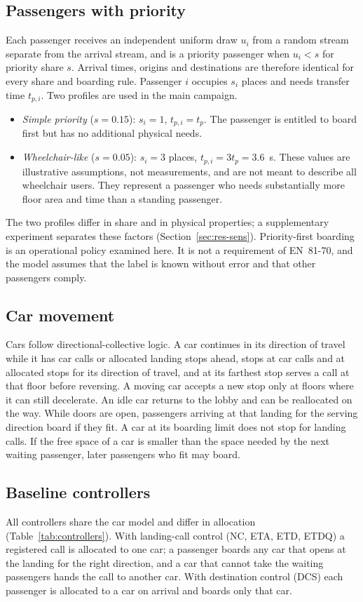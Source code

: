 \documentclass[12pt,a4paper]{article}
\begin{document}
\subsection{Passengers with priority}\label{sec:profiles}
Each passenger receives an independent uniform draw $u_i$ from a random stream separate from the arrival stream, and is a priority passenger when $u_i<s$ for priority share $s$. Arrival times, origins and destinations are therefore identical for every share and boarding rule. Passenger $i$ occupies $s_i$ places and needs transfer time $t_{p,i}$. Two profiles are used in the main campaign.
\begin{itemize}[itemsep=1pt]
\item \emph{Simple priority} ($s=0.15$): $s_i=1$, $t_{p,i}=t_p$. The passenger is entitled to board first but has no additional physical needs.
\item \emph{Wheelchair-like} ($s=0.05$): $s_i=3$ places, $t_{p,i}=3t_p=3.6$~s. These values are illustrative assumptions, not measurements, and are not meant to describe all wheelchair users. They represent a passenger who needs substantially more floor area and time than a standing passenger.
\end{itemize}
The two profiles differ in share and in physical properties; a supplementary experiment separates these factors (Section~\ref{sec:res-sens}). Priority-first boarding is an operational policy examined here. It is not a requirement of EN~81-70, and the model assumes that the label is known without error and that other passengers comply.

\subsection{Car movement}
Cars follow directional-collective logic. A car continues in its direction of travel while it has car calls or allocated landing stops ahead, stops at car calls and at allocated stops for its direction of travel, and at its farthest stop serves a call at that floor before reversing. A moving car accepts a new stop only at floors where it can still decelerate. An idle car returns to the lobby and can be reallocated on the way. While doors are open, passengers arriving at that landing for the serving direction board if they fit. A car at its boarding limit does not stop for landing calls. If the free space of a car is smaller than the space needed by the next waiting passenger, later passengers who fit may board.

\subsection{Baseline controllers}\label{sec:controllers}
All controllers share the car model and differ in allocation (Table~\ref{tab:controllers}). With landing-call control (NC, ETA, ETD, ETDQ) a registered call is allocated to one car; a passenger boards any car that opens at the landing for the right direction, and a car that cannot take the waiting passengers hands the call to another car. With destination control (DCS) each passenger is allocated to a car on arrival and boards only that car.
\end{document}
